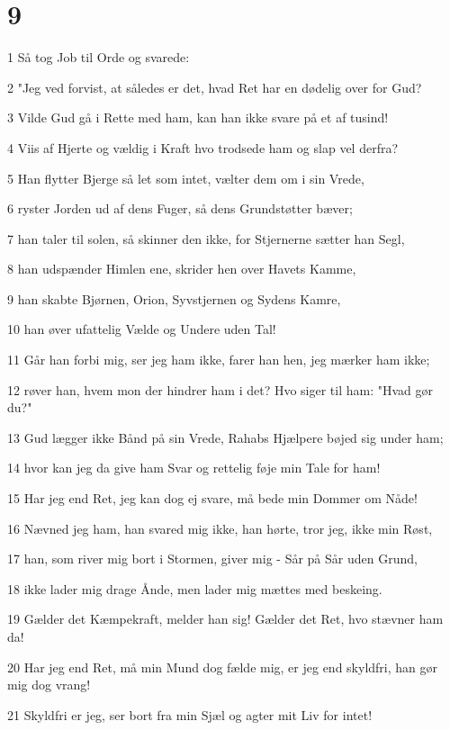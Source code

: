 \chapter{9}

\par 1 Så tog Job til Orde og svarede:
\par 2 "Jeg ved forvist, at således er det, hvad Ret har en dødelig over for Gud?
\par 3 Vilde Gud gå i Rette med ham, kan han ikke svare på et af tusind!
\par 4 Viis af Hjerte og vældig i Kraft hvo trodsede ham og slap vel derfra?
\par 5 Han flytter Bjerge så let som intet, vælter dem om i sin Vrede,
\par 6 ryster Jorden ud af dens Fuger, så dens Grundstøtter bæver;
\par 7 han taler til solen, så skinner den ikke, for Stjernerne sætter han Segl,
\par 8 han udspænder Himlen ene, skrider hen over Havets Kamme,
\par 9 han skabte Bjørnen, Orion, Syvstjernen og Sydens Kamre,
\par 10 han øver ufattelig Vælde og Undere uden Tal!
\par 11 Går han forbi mig, ser jeg ham ikke, farer han hen, jeg mærker ham ikke;
\par 12 røver han, hvem mon der hindrer ham i det? Hvo siger til ham: "Hvad gør du?"
\par 13 Gud lægger ikke Bånd på sin Vrede, Rahabs Hjælpere bøjed sig under ham;
\par 14 hvor kan jeg da give ham Svar og rettelig føje min Tale for ham!
\par 15 Har jeg end Ret, jeg kan dog ej svare, må bede min Dommer om Nåde!
\par 16 Nævned jeg ham, han svared mig ikke, han hørte, tror jeg, ikke min Røst,
\par 17 han, som river mig bort i Stormen, giver mig - Sår på Sår uden Grund,
\par 18 ikke lader mig drage Ånde, men lader mig mættes med beskeing.
\par 19 Gælder det Kæmpekraft, melder han sig! Gælder det Ret, hvo stævner ham da!
\par 20 Har jeg end Ret, må min Mund dog fælde mig, er jeg end skyldfri, han gør mig dog vrang!
\par 21 Skyldfri er jeg, ser bort fra min Sjæl og agter mit Liv for intet!

